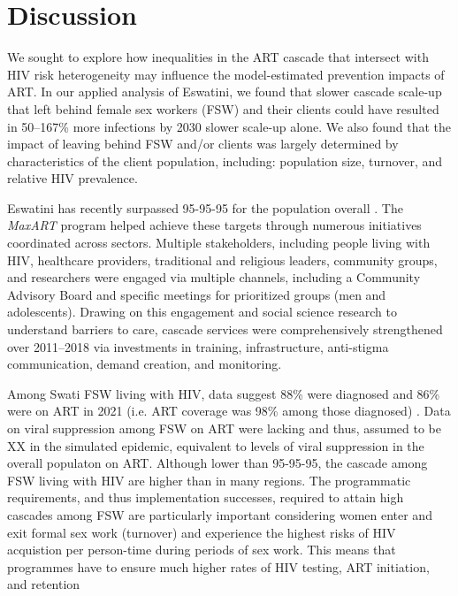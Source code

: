 \section{Discussion}\label{art.disc}
We sought to explore how inequalities in the ART cascade
that intersect with HIV risk heterogeneity
may influence the model-estimated prevention impacts of ART.
In our applied analysis of Eswatini, we found that
slower cascade scale-up that left behind female sex workers (FSW) and their clients
could have resulted in 50--167\% more infections by 2030 \vs slower scale-up alone.
We also found that the impact of
leaving behind FSW and/or clients was largely determined by
characteristics of the client population, including:
population size, turnover, and relative HIV prevalence.
\par
Eswatini has recently surpassed 95-95-95 for the population overall \cite{SHIMS3}.
The \emph{MaxART} program \cite{MaxART2} helped achieve these targets through
numerous initiatives coordinated across sectors.
Multiple stakeholders, including people living with HIV, healthcare providers, %
traditional and religious leaders, community groups, and researchers
were engaged via multiple channels, including a Community Advisory Board
and specific meetings for prioritized groups (men and adolescents).
Drawing on this engagement and
social science research to understand barriers to care,
cascade services were comprehensively strengthened over 2011--2018 via investments in
training, infrastructure, anti-stigma communication, demand creation, and monitoring. %
\par
Among Swati FSW living with HIV, data suggest 88\%
were diagnosed and 86\% were on ART  in 2021 (i.e. ART coverage was 98\%  among those diagnosed)  \cite{EswIBBS2022}. 
Data on viral suppression among FSW on ART were lacking and thus, assumed to be XX in the simulated epidemic, equivalent to 
levels of viral suppression in the overall populaton on ART. %
Although lower than 95-95-95, the cascade among FSW living with HIV
are higher than in many regions. %
The programmatic requirements, and thus implementation successes, 
required to attain high cascades among FSW are particularly important
considering women enter and exit 
formal sex work (turnover) and experience the 
highest risks of HIV acquistion per person-time during periods of sex work.
This means that programmes have to ensure much higher rates of HIV testing, ART initiation, and retention
